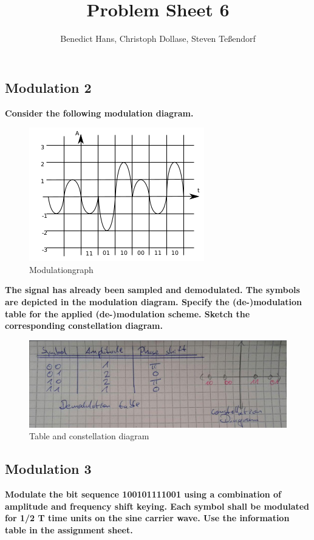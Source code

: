 \documentclass[a4paper,12pt]{article}
\author{Benedict Hans, Christoph Dollase, Steven Te\ss endorf}
\title{ \textbf{Problem Sheet 6}}
\begin{document}
	 
	\maketitle	 %
	
	\subsection{Modulation 2}
	\textbf{Consider the following modulation diagram.}
    
	\begin{figure}[h!]
		\includegraphics[width=0.4\linewidth]{modulation.png} 
    	\caption{Modulationgraph}
	\end{figure}
    
    \textbf{The signal has already been sampled and demodulated. The symbols are depicted in the 
	modulation diagram. Specify the (de-)modulation table for the applied (de-)modulation scheme.
	Sketch the corresponding constellation diagram.}

    \begin{figure}[h!] 
        \includegraphics[width=1\linewidth]{mod_solution.png} 
	    \caption{Table and constellation diagram}
    \end{figure}
	
	\newpage
	
	\subsection{Modulation 3}
	\textbf{Modulate the bit sequence 100101111001 using a combination of amplitude and frequency
	shift keying. Each symbol shall be modulated for 1/2 T time units on the sine carrier wave.
	Use the information table in the assignment sheet.}
	
\end{document}
